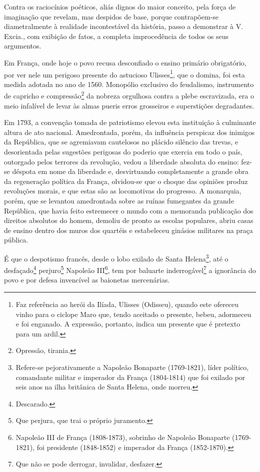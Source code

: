 Contra os raciocínios poéticos, aliás dignos do maior conceito, pela
força de imaginação que revelam, mas despidos de base, porque
contrapõem-se diametralmente à realidade incontestável da história,
passo a demonstrar à V. Excia., com exibição de fatos, a completa
improcedência de todos os seus argumentos.

Em França, onde hoje o povo recusa desconfiado o ensino primário
obrigatório, por ver nele um perigoso presente do astucioso
Ulisses\footnote{Faz referência ao herói da Ilíada, Ulisses (Odisseu),
  quando este ofereceu vinho para o ciclope Maro que, tendo aceitado o
  presente, bebeu, adormeceu e foi enganado. A expressão, portanto,
  indica um presente que é pretexto para um ardil.}, que o domina, foi
esta medida adotada no ano de 1560. Monopólio exclusivo do feudalismo,
instrumento de capricho e compressão\footnote{Opressão, tirania.} da
nobreza orgulhosa contra a plebe escravizada, era o meio infalível de
levar às almas pueris erros grosseiros e superstições degradantes.

Em 1793, a convenção tomada de patriotismo elevou esta instituição à
culminante altura de ato nacional. Amedrontada, porém, da influência
perspicaz dos inimigos da República, que se agremiavam cautelosos no
plácido silêncio das trevas, e desorientada pelas sugestões perigosas do
poderio que exercia em todo o país, outorgado pelos terrores da
revolução, vedou a liberdade absoluta do ensino: fez-se déspota em nome
da liberdade e, desvirtuando completamente a grande obra da regeneração
política da França, olvidou-se que o choque das opiniões produz
revoluções morais, e que estas são as locomotivas do progresso. A
monarquia, porém, que se levantou amedrontada sobre as ruínas fumegantes
da grande República, que havia feito estremecer o mundo com a memoranda
publicação dos direitos absolutos do homem, demoliu de pronto as escolas
populares, abriu casas de ensino dentro dos muros dos quartéis e
estabeleceu ginásios militares na praça pública.

É que o despotismo francês, desde o lobo exilado de Santa
Helena\footnote{Refere-se pejorativamente a Napoleão Bonaparte
  (1769-1821), líder político, comandante militar e imperador da França
  (1804-1814) que foi exilado por seis anos na ilha britânica de Santa
  Helena, onde morreu.}, até o desfaçado\footnote{Descarado.}
perjuro\footnote{Que perjura, que trai o próprio juramento.} Napoleão
III\footnote{Napoleão III de França (1808-1873), sobrinho de Napoleão
  Bonaparte (1769-1821), foi presidente (1848-1852) e imperador da
  França (1852-1870).}, tem por baluarte inderrogável\footnote{Que não
  se pode derrogar, invalidar, desfazer.} a ignorância do povo e por
defesa invencível as baionetas mercenárias.

